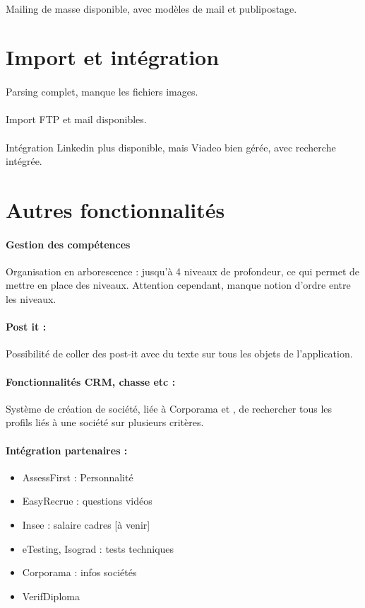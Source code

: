 \paragraph{} Mailing de masse disponible, avec modèles de mail et publipostage.


\section{Import et intégration}
\paragraph{} Parsing complet, manque les fichiers images.
\paragraph{} Import FTP et mail disponibles.
\paragraph{} Intégration Linkedin plus disponible, mais Viadeo bien gérée, avec recherche intégrée.


\section{Autres fonctionnalités}
\paragraph{Gestion des compétences} Organisation en arborescence : jusqu'à 4 niveaux de profondeur, ce qui permet de mettre en place des niveaux. Attention cependant, manque notion d'ordre entre les niveaux.
\paragraph{Post it :} Possibilité de coller des post-it avec du texte sur tous les objets de l'application.
\paragraph{Fonctionnalités CRM, chasse etc :} Système de création de société, liée à Corporama et , de rechercher tous les profils liés à une société sur plusieurs critères.
\paragraph{Intégration partenaires :} \begin{itemize}
	\item AssessFirst : Personnalité
	\item EasyRecrue : questions vidéos
	\item Insee : salaire cadres [à venir]
	\item eTesting, Isograd : tests techniques
	\item Corporama : infos sociétés
	\item VerifDiploma
\end{itemize}

